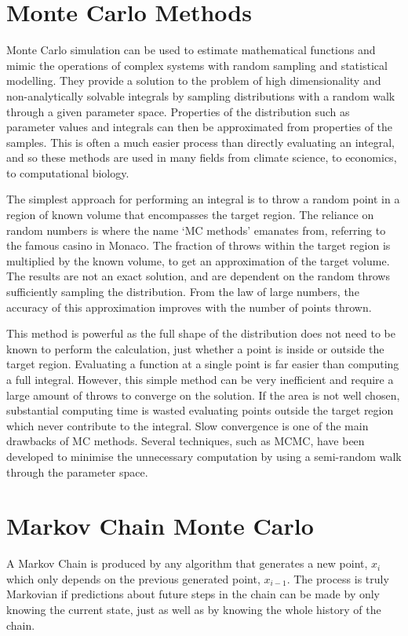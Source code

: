 \section{Monte Carlo Methods}\label{sec:montecarlo}
Monte Carlo simulation can be used to estimate mathematical functions and mimic the operations of complex systems with random sampling and statistical modelling. They provide a solution to the problem of high dimensionality and non-analytically solvable integrals by sampling distributions with a random walk through a given parameter space. Properties of the distribution such as parameter values and integrals can then be approximated from properties of the samples. This is often a much easier process than directly evaluating an integral, and so these methods are used in many fields from climate science, to economics, to computational biology.

The simplest approach for performing an integral is to throw a random point in a region of known volume that encompasses the target region. The reliance on random numbers is where the name `MC methods' emanates from, referring to the famous casino in Monaco. The fraction of throws within the target region is multiplied by the known volume, to get an approximation of the target volume. The results are not an exact solution, and are dependent on the random throws sufficiently sampling the distribution. From the law of large numbers, the accuracy of this approximation improves with the number of points thrown. 

This method is powerful as the full shape of the distribution does not need to be known to perform the calculation, just whether a point is inside or outside the target region. Evaluating a function at a single point is far easier than computing a full integral. However, this simple method can be very inefficient and require a large amount of throws to converge on the solution. If the area is not well chosen, substantial computing time is wasted evaluating points outside the target region which never contribute to the integral. Slow convergence is one of the main drawbacks of MC methods. Several techniques, such as MCMC, have been developed to minimise the unnecessary computation by using a semi-random walk through the parameter space.

\section{Markov Chain Monte Carlo}\label{sec:mcmc}

A Markov Chain is produced by any algorithm that generates a new point, $x_i$ which only depends on the previous generated point, $x_{i-1}$. The process is truly Markovian if predictions about future steps in the chain can be made by only knowing the current state, just as well as by knowing the whole history of the chain. 

